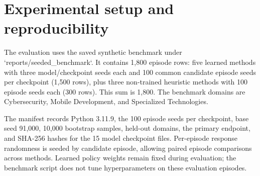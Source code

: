 \documentclass{ieeeaccess}
\begin{document}
\begin{table}[t]\centering\small

\caption{Table 5. Methods included in the seeded comparison}


\end{table}

\section{Experimental setup and reproducibility}

The evaluation uses the saved synthetic benchmark under `reports/seeded\_benchmark`. It contains 1,800 episode rows: five learned methods with three model/checkpoint seeds each and 100 common candidate episode seeds per checkpoint (1,500 rows), plus three non-trained heuristic methods with 100 episode seeds each (300 rows). This sum is 1,800. The benchmark domains are Cybersecurity, Mobile Development, and Specialized Technologies.

The manifest records Python 3.11.9, the 100 episode seeds per checkpoint, base seed 91,000, 10,000 bootstrap samples, held-out domains, the primary endpoint, and SHA-256 hashes for the 15 model checkpoint files. Per-episode response randomness is seeded by candidate episode, allowing paired episode comparisons across methods. Learned policy weights remain fixed during evaluation; the benchmark script does not tune hyperparameters on these evaluation episodes.
\end{document}
